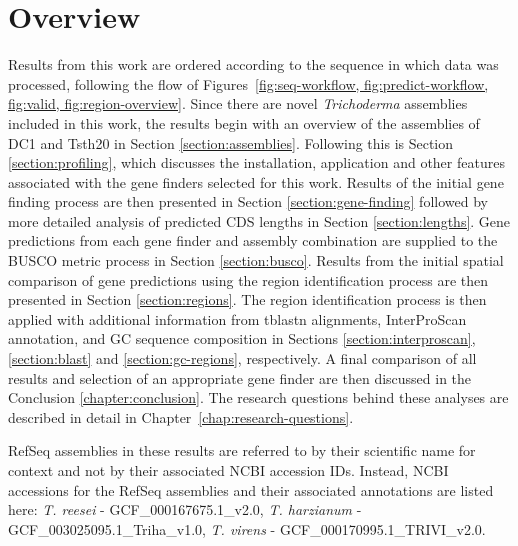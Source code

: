\section{Overview}

Results from this work are ordered according to the sequence in which data was processed, following the flow of Figures~\ref{fig:seq-workflow, fig:predict-workflow, fig:valid, fig:region-overview}. Since there are novel
\textit{Trichoderma} assemblies included in this work, the results
begin with an overview of the assemblies of DC1 and Tsth20 in Section
\ref{section:assemblies}. Following this is Section
\ref{section:profiling}, which discusses the installation, application
and other features associated with the gene finders selected for this
work. Results of the initial gene finding process are then presented
in Section \ref{section:gene-finding} followed by more detailed
analysis of predicted CDS lengths in Section
\ref{section:lengths}. Gene predictions from each gene finder and
assembly combination are supplied to the BUSCO metric process in
Section \ref{section:busco}. Results from the initial spatial
comparison of gene predictions using the region identification process
are then presented in Section \ref{section:regions}. The region
identification process is then applied with additional information
from tblastn alignments, InterProScan annotation, and GC sequence
composition in Sections \ref{section:interproscan},
\ref{section:blast} and \ref{section:gc-regions}, respectively. A
final comparison of all results and selection of an appropriate gene
finder are then discussed in the Conclusion \ref{chapter:conclusion}. The research questions behind these analyses are described in detail in Chapter~\ref{chap:research-questions}.

RefSeq assemblies in these results are referred to by their scientific
name for context and not by their associated NCBI accession
IDs. Instead, NCBI accessions for the RefSeq assemblies and their
associated annotations are listed here: \textit{T. reesei} -
GCF\_000167675.1\_v2.0, \textit{T. harzianum} -
GCF\_003025095.1\_Triha\_v1.0, \textit{T. virens} - GCF\_000170995.1\_TRIVI\_v2.0.
